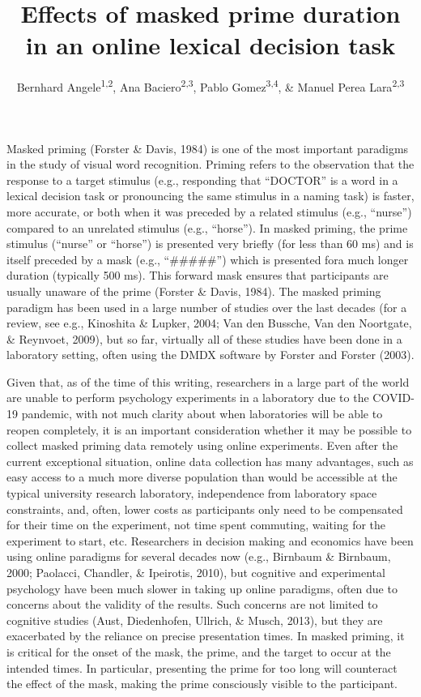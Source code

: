 \documentclass[
  english,
  man]{apa6}
\author{Bernhard Angele\textsuperscript{1,2}, Ana Baciero\textsuperscript{2,3}, Pablo Gomez\textsuperscript{3,4}, \& Manuel Perea Lara\textsuperscript{2,3}}
\affiliation{
\vspace{0.5cm}
\textsuperscript{1} Bournemouth University\\\textsuperscript{2} Universitat de Valencia, Valencia, Spain\\\textsuperscript{3} Nebrija University, Madrid, Spain\\\textsuperscript{4} California State University San Bernardino, Palm Desert Campus}
\title{Effects of masked prime duration in an online lexical decision task}
\date{}
\begin{document}
\maketitle

Masked priming (Forster \& Davis, 1984) is one of the most important paradigms in the study of visual word recognition. Priming refers to the observation that the response to a target stimulus (e.g., responding that ``DOCTOR'' is a word in a lexical decision task or pronouncing the same stimulus in a naming task) is faster, more accurate, or both when it was preceded by a related stimulus (e.g., ``nurse'') compared to an unrelated stimulus (e.g., ``horse''). In masked priming, the prime stimulus (``nurse'' or ``horse'') is presented very briefly (for less than 60 ms) and is itself preceded by a mask (e.g., ``\#\#\#\#\#'') which is presented fora much longer duration (typically 500 ms). This forward mask ensures that participants are usually unaware of the prime (Forster \& Davis, 1984). The masked priming paradigm has been used in a large number of studies over the last decades (for a review, see e.g., Kinoshita \& Lupker, 2004; Van den Bussche, Van den Noortgate, \& Reynvoet, 2009), but so far, virtually all of these studies have been done in a laboratory setting, often using the DMDX software by Forster and Forster (2003).

Given that, as of the time of this writing, researchers in a large part of the world are unable to perform psychology experiments in a laboratory due to the COVID-19 pandemic, with not much clarity about when laboratories will be able to reopen completely, it is an important consideration whether it may be possible to collect masked priming data remotely using online experiments. Even after the current exceptional situation, online data collection has many advantages, such as easy access to a much more diverse population than would be accessible at the typical university research laboratory, independence from laboratory space constraints, and, often, lower costs as participants only need to be compensated for their time on the experiment, not time spent commuting, waiting for the experiment to start, etc. Researchers in decision making and economics have been using online paradigms for several decades now (e.g., Birnbaum \& Birnbaum, 2000; Paolacci, Chandler, \& Ipeirotis, 2010), but cognitive and experimental psychology have been much slower in taking up online paradigms, often due to concerns about the validity of the results. Such concerns are not limited to cognitive studies (Aust, Diedenhofen, Ullrich, \& Musch, 2013), but they are exacerbated by the reliance on precise presentation times. In masked priming, it is critical for the onset of the mask, the prime, and the target to occur at the intended times. In particular, presenting the prime for too long will counteract the effect of the mask, making the prime consciously visible to the participant.
\end{document}
